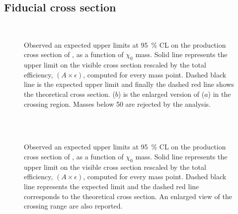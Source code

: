 \subsection{Fiducial cross section}
\label{sec:fid}



\begin{figure}[p]
\centering
{} \\
 \quad
\caption{Observed an expected upper limits at \SI{95}{\percent} CL  on the production cross section of \chizero, as a function of $\chi_0$ mass. Solid line represents the upper limit on the visible cross section rescaled by the total efficiency, $\left(A\times\epsilon\right)$, computed for every mass point. Dashed black line is the expected upper limit and finally the dashed red line shows the theoretical cross section. ($b$) is the enlarged version of ($a$) in the crossing region. Masses below \SI{50}{\gev} are rejected by the analysis.}
\label{fig:exclMI}
\end{figure}

\begin{figure}[p]
\centering
{} \quad
{} \\
 \quad
{} \\
\caption{Observed an expected upper limits at \SI{95}{\percent} CL on the production cross section of \chizero, as a function of $\chi_0$ mass. Solid line represents the upper limit on the visible cross section rescaled by the total efficiency, $\left(A\times\epsilon\right)$, computed for every mass point. Dashed black line represents the expected limit and the dashed red line corresponds to the  theoretical cross section. An enlarged view of the crossing range are also reported.}
\label{fig:outlookmi}
\end{figure}

